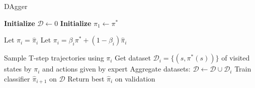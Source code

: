 











\begin{algorithm}[H]
\caption{DAgger}
\begin{algorithmic}[1]
\State \textbf{Initialize} $\mathcal{D} \leftarrow 0$ 
\State \textbf{Initialize} $\hat{\pi}_1 \leftarrow \pi^*$ 

\State Let $\pi_i = \hat{\pi}_i$
\EndIf
{}
\State Let $\pi_i = \beta_i\pi^* + (1 -\beta_i)\hat{\pi}_i$
\EndIf


\State Sample T-step trajectories using $\pi_i$
\State Get dataset  $\mathcal{D}_i = \{(s, \pi^*(s))\}$ of visited states by $\pi_i$ and actions given by expert
\State Aggregate datasets:  $\mathcal{D} \leftarrow \mathcal{D} \cup  \mathcal{D}_i$
\State  Train classifier $\hat{\pi}_{i+1}$ on $\mathcal{D}$
\EndFor
\State Return best $\hat{\pi}_i$ on validation
\end{algorithmic}
\label{al:DAgger}
\end{algorithm}



